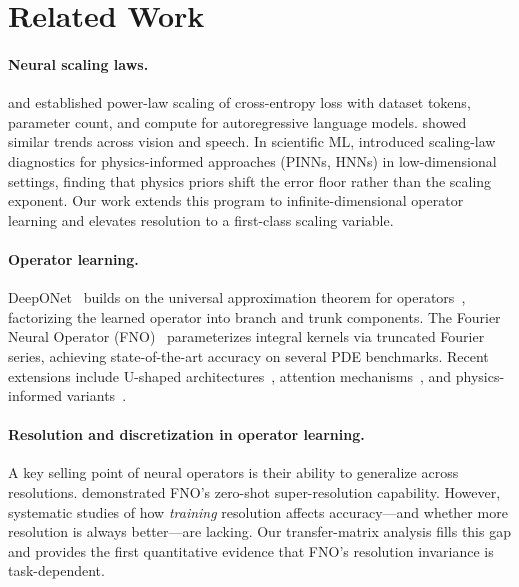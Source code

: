 \documentclass[11pt]{article}
\begin{document}
\section{Related Work}
\label{sec:related}

\paragraph{Neural scaling laws.}
\citet{kaplan2020scaling} and \citet{hoffmann2022training} established
power-law scaling of cross-entropy loss with dataset tokens, parameter
count, and compute for autoregressive language models.
\citet{hestness2017deep} showed similar trends across vision and speech.
In scientific ML, \citet{perrier2025scaling} introduced scaling-law
diagnostics for physics-informed approaches (PINNs, HNNs) in
low-dimensional settings, finding that physics priors shift the error
floor rather than the scaling exponent. Our work extends this program to
infinite-dimensional operator learning and elevates resolution to a
first-class scaling variable.

\paragraph{Operator learning.}
DeepONet~\citep{lu2021learning} builds on the universal approximation
theorem for operators~\citep{chen1995universal}, factorizing the learned
operator into branch and trunk components. The Fourier Neural Operator
(FNO)~\citep{li2021fourier} parameterizes integral kernels via
truncated Fourier series, achieving state-of-the-art accuracy on
several PDE benchmarks. Recent extensions include U-shaped
architectures~\citep{wen2022ufno}, attention
mechanisms~\citep{hao2023gnot}, and physics-informed
variants~\citep{wang2021learning}.

\paragraph{Resolution and discretization in operator learning.}
A key selling point of neural operators is their ability to generalize
across resolutions. \citet{li2021fourier} demonstrated FNO's
zero-shot super-resolution capability. However, systematic studies of
how \emph{training} resolution affects accuracy---and whether more
resolution is always better---are lacking. Our transfer-matrix analysis
fills this gap and provides the first quantitative evidence that FNO's
resolution invariance is task-dependent.
\end{document}
